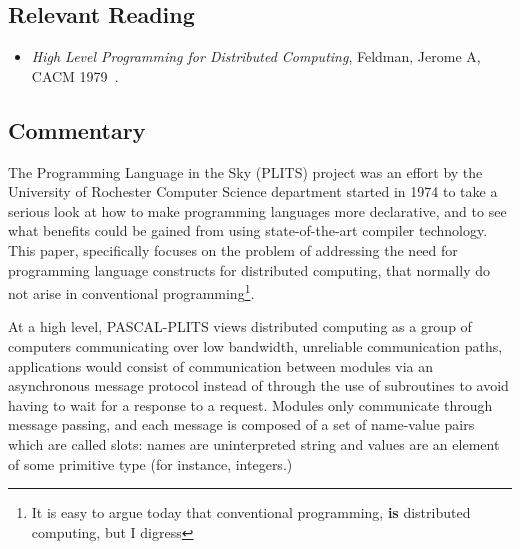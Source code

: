 \subsection{Relevant Reading}

\begin{itemize}
	\item \textit{High Level Programming for Distributed Computing}, Feldman, Jerome A, CACM 1979~\cite{feldman1979high}.
\end{itemize}

\subsection{Commentary}

The Programming Language in the Sky (PLITS) project was an effort by the University of Rochester Computer Science department started in 1974 to take a serious look at how to make programming languages more declarative, and to see what benefits could be gained from using state-of-the-art compiler technology.  This paper, specifically focuses on the problem of addressing the need for programming language constructs for distributed computing, that normally do not arise in conventional programming\footnote{It is easy to argue today that conventional programming, \textbf{is} distributed computing, but I digress}.

At a high level, PASCAL-PLITS views distributed computing as a group of computers communicating over low bandwidth, unreliable communication paths, applications would consist of communication between modules via an asynchronous message protocol instead of through the use of subroutines to avoid having to wait for a response to a request.  Modules only communicate through message passing, and each message is composed of a set of name-value pairs which are called slots: names are uninterpreted string and values are an element of some primitive type (for instance, integers.)

